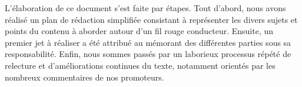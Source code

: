 L'élaboration de ce document s'est faite par étapes. Tout d'abord, nous avons réalisé un plan de rédaction simplifiée consistant à représenter les divers sujets et points du contenu à aborder autour d'un fil rouge conducteur. Ensuite, un premier jet à réaliser a été attribué au mémorant des différentes parties sous sa responsabilité. Enfin, nous sommes passés par un laborieux processus répété de relecture et d'améliorations continues du texte, notamment orientés par les nombreux commentaires de nos promoteurs.